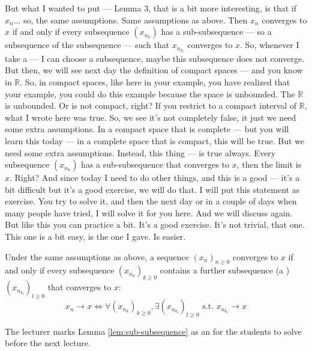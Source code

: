 
\begin{spoken-clean}[00:13:41 - 00:15:50]
But what I wanted to put — Lemma 3, that is a bit more interesting, is that if $x_n$... so, the same assumptions. Same assumptions as above. Then $x_n$ converges to $x$ if and only if every subsequence $(x_{n_k})$ has a sub-subsequence — so a subsequence of the subsequence — such that $x_{n_{k_l}}$ converges to $x$. So, whenever I take a — I can choose a subsequence, maybe this subsequence does not converge. But then, we will see next day the definition of compact spaces — and you know in $\mathbb{R}$. So, in compact spaces, like here in your example, you have realized that your example, you could do this example because the space is unbounded. The $\mathbb{R}$ is unbounded. Or is not compact, right? If you restrict to a compact interval of $\mathbb{R}$, what I wrote here was true. So, we see it's not completely false, it just we need some extra assumptions. In a compact space that is complete — but you will learn this today — in a complete space that is compact, this will be true. But we need some extra assumptions. Instead, this thing — is true always. Every subsequence $(x_{n_k})$ has a sub-subsequence that converges to $x$, then the limit is $x$. Right? And since today I need to do other things, and this is a good — it's a bit difficult but it's a good exercise, we will do that. I will put this statement as exercise. You try to solve it, and then the next day or in a couple of days when many people have tried, I will solve it for you here. And we will discuss again. But like this you can practice a bit. It's a good exercise. It's not trivial, that one. This one is a bit easy, is the one I gave. Is easier.
\end{spoken-clean}

\begin{math-stroke}
\begin{lemma}\label{lem:sub-subsequence}
Under the same assumptions as above, a sequence $(x_n)_{n \ge 0}$ converges to $x$ if and only if every subsequence $(x_{n_k})_{k \ge 0}$ contains a further subsequence (a ) $(x_{n_{k_l}})_{l \ge 0}$ that converges to $x$:
\[ x_n \to x \iff \forall (x_{n_k})_{k \ge 0}, \exists (x_{n_{k_l}})_{l \ge 0} \text{ s.t. } x_{n_{k_l}} \to x \]
\end{lemma}
\begin{nice-box}[Exercise]
The lecturer marks Lemma \ref{lem:sub-subsequence} as an  for the students to solve before the next lecture.
\end{nice-box}
\end{math-stroke}

